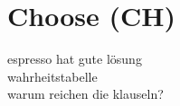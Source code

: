 \section{Choose (CH)}
\label{sec:knf:ch}


espresso hat gute lösung\\
wahrheitstabelle\\
warum reichen die klauseln?